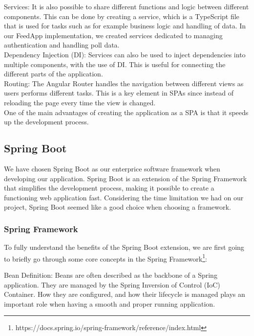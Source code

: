 \noindent Services: It is also possible to share different functions and logic between different components. This
can be done by creating a service, which is a TypeScript file that is used for tasks such as for example
business logic and handling of data. In our FeedApp implementation, we created services dedicated to managing authentication and handling poll data. \\

\noindent Dependency Injection (DI): Services can also be used to inject dependencies into multiple
components, with the use of DI. This is useful for connecting the different parts of the application. \\

\noindent Routing: The Angular Router handles the navigation between different views as users performs different tasks. This is a key element in SPAs since instead of reloading the page every time the view is changed. \\

\noindent One of the main advantages of creating the application as a SPA is that it speeds up the development
process.


\subsection{Spring Boot}
\label{subsec:springboot}

We have chosen Spring Boot as our enterprice software framework when developing our application. Spring Boot is an extension of the Spring Framework that simplifies the development process, making it possible to create a functioning web application fast. Considering the time limitation we had on our project, Spring Boot seemed like a good choice when choosing a framework. 

\subsubsection{Spring Framework}

To fully understand the benefits of the Spring Boot extension, we are first going to briefly go through some core concepts in the Spring Framework\footnote{https://docs.spring.io/spring-framework/reference/index.html}:

\noindent Bean Definition: Beans are often described as the backbone of a Spring application. They are managed by the Spring Inversion of Control (IoC) Container. How they are configured, and how their lifecycle is managed plays an important role when having a smooth and proper running application. \\

